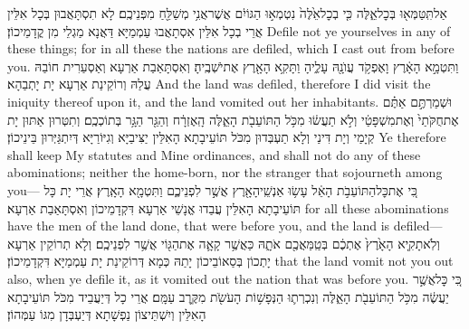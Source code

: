 {אַל\maqqaf תִּֽטַּמְּא֖וּ בְּכׇל\maqqaf אֵ֑לֶּה כִּ֤י בְכׇל\maqqaf אֵ֙לֶּה֙ נִטְמְא֣וּ הַגּוֹיִ֔ם אֲשֶׁר\maqqaf אֲנִ֥י מְשַׁלֵּ֖חַ מִפְּנֵיכֶֽם׃}
{לָא תִסְתָּאֲבוּן בְּכָל אִלֵּין אֲרֵי בְכָל אִלֵּין אִסְתָאֲבוּ עַמְמַיָּא דַּאֲנָא מַגְלֵי מִן קֳדָמֵיכוֹן׃}
{Defile not ye yourselves in any of these things; for in all these the nations are defiled, which I cast out from before you.}{}
{וַתִּטְמָ֣א הָאָ֔רֶץ וָאֶפְקֹ֥ד עֲוֺנָ֖הּ עָלֶ֑יהָ וַתָּקִ֥א הָאָ֖רֶץ אֶת\maqqaf יֹשְׁבֶֽיהָ׃}
{וְאִסְתָּאַבַת אַרְעָא וְאַסְעַרִית חוֹבַהּ עֲלַהּ וְרוֹקֵינַת אַרְעָא יָת יָתְבַהָא׃}
{And the land was defiled, therefore I did visit the iniquity thereof upon it, and the land vomited out her inhabitants.}{}
{וּשְׁמַרְתֶּ֣ם אַתֶּ֗ם אֶת\maqqaf חֻקֹּתַי֙ וְאֶת\maqqaf מִשְׁפָּטַ֔י וְלֹ֣א תַעֲשׂ֔וּ מִכֹּ֥ל הַתּוֹעֵבֹ֖ת הָאֵ֑לֶּה הָֽאֶזְרָ֔ח וְהַגֵּ֖ר הַגָּ֥ר בְּתוֹכְכֶֽם׃}
{וְתִטְּרוּן אַתּוּן יָת קְיָמַי וְיָת דִּינַי וְלָא תַעְבְּדוּן מִכֹּל תּוֹעֵיבָתָא הָאִלֵּין יַצִּיבַיָּא וְגִיּוֹרַיָּא דְּיִתְגַּיְּרוּן בֵּינֵיכוֹן׃}
{Ye therefore shall keep My statutes and Mine ordinances, and shall not do any of these abominations; neither the home-born, nor the stranger that sojourneth among you—}{}
{כִּ֚י אֶת\maqqaf כׇּל\maqqaf הַתּוֹעֵבֹ֣ת הָאֵ֔ל עָשׂ֥וּ אַנְשֵֽׁי\maqqaf הָאָ֖רֶץ אֲשֶׁ֣ר לִפְנֵיכֶ֑ם וַתִּטְמָ֖א הָאָֽרֶץ׃}
{אֲרֵי יָת כָּל תּוֹעֵיבָתָא הָאִלֵּין עֲבַדוּ אֱנָשֵׁי אַרְעָא דִּקְדָמֵיכוֹן וְאִסְתָּאַבַת אַרְעָא׃}
{for all these abominations have the men of the land done, that were before you, and the land is defiled—}{}
{וְלֹֽא\maqqaf תָקִ֤יא הָאָ֙רֶץ֙ אֶתְכֶ֔ם בְּטַֽמַּאֲכֶ֖ם אֹתָ֑הּ כַּאֲשֶׁ֥ר קָאָ֛ה אֶת\maqqaf הַגּ֖וֹי אֲשֶׁ֥ר לִפְנֵיכֶֽם׃}
{וְלָא תְרוֹקֵין אַרְעָא יָתְכוֹן בְּסַאוֹבֵיכוֹן יָתַהּ כְּמָא דְּרוֹקֵינַת יָת עַמְמַיָּא דִּקְדָמֵיכוֹן׃}
{that the land vomit not you out also, when ye defile it, as it vomited out the nation that was before you.}{}
{כִּ֚י כׇּל\maqqaf אֲשֶׁ֣ר יַעֲשֶׂ֔ה מִכֹּ֥ל הַתּוֹעֵבֹ֖ת הָאֵ֑לֶּה וְנִכְרְת֛וּ הַנְּפָשׁ֥וֹת הָעֹשֹׂ֖ת מִקֶּ֥רֶב עַמָּֽם׃}
{אֲרֵי כָל דְּיַעֲבֵיד מִכֹּל תּוֹעֵיבָתָא הָאִלֵּין וְיִשְׁתֵּיצוֹן נַפְשָׁתָא דְּיַעְבְּדָן מִגּוֹ עַמְּהוֹן׃}
